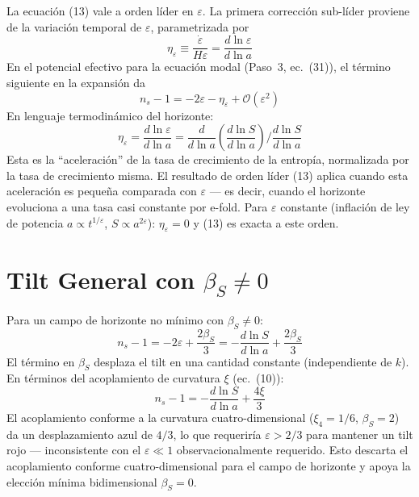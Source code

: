 \documentclass[12pt,a4paper]{article}
\begin{document}
La ecuación (13) vale a orden líder en $\varepsilon$. La primera corrección sub-líder proviene de la variación temporal de $\varepsilon$, parametrizada por
\begin{equation}
\eta_\varepsilon \equiv \frac{\dot{\varepsilon}}{H\varepsilon} = \frac{d\ln\varepsilon}{d\ln a} \tag{15}
\end{equation}
En el potencial efectivo para la ecuación modal (Paso~3, ec.~(31)), el término siguiente en la expansión da
\begin{equation}
n_s - 1 = -2\varepsilon - \eta_\varepsilon + \mathcal{O}(\varepsilon^2) \tag{16}
\end{equation}
En lenguaje termodinámico del horizonte:
\begin{equation}
\eta_\varepsilon = \frac{d\ln\varepsilon}{d\ln a} = \frac{d}{d\ln a}\!\left(\frac{d\ln S}{d\ln a}\right) \bigg/ \frac{d\ln S}{d\ln a} \tag{17}
\end{equation}
Esta es la ``aceleración'' de la tasa de crecimiento de la entropía, normalizada por la tasa de crecimiento misma. El resultado de orden líder (13) aplica cuando esta aceleración es pequeña comparada con $\varepsilon$ --- es decir, cuando el horizonte evoluciona a una tasa casi constante por e-fold. Para $\varepsilon$ constante (inflación de ley de potencia $a \propto t^{1/\varepsilon}$, $S \propto a^{2\varepsilon}$): $\eta_\varepsilon = 0$ y (13) es exacta a este orden.

\section{Tilt General con $\beta_S \neq 0$}

Para un campo de horizonte no mínimo con $\beta_S \neq 0$:
\begin{equation}
n_s - 1 = -2\varepsilon + \frac{2\beta_S}{3} = -\frac{d\ln S}{d\ln a} + \frac{2\beta_S}{3} \tag{18}
\end{equation}
El término en $\beta_S$ desplaza el tilt en una cantidad constante (independiente de $k$). En términos del acoplamiento de curvatura $\xi$ (ec.~(10)):
\begin{equation}
n_s - 1 = -\frac{d\ln S}{d\ln a} + \frac{4\xi}{3} \tag{19}
\end{equation}
El acoplamiento conforme a la curvatura cuatro-dimensional ($\xi_4 = 1/6$, $\beta_S = 2$) da un desplazamiento azul de $4/3$, lo que requeriría $\varepsilon > 2/3$ para mantener un tilt rojo --- inconsistente con el $\varepsilon \ll 1$ observacionalmente requerido. Esto descarta el acoplamiento conforme cuatro-dimensional para el campo de horizonte y apoya la elección mínima bidimensional $\beta_S = 0$.
\end{document}

